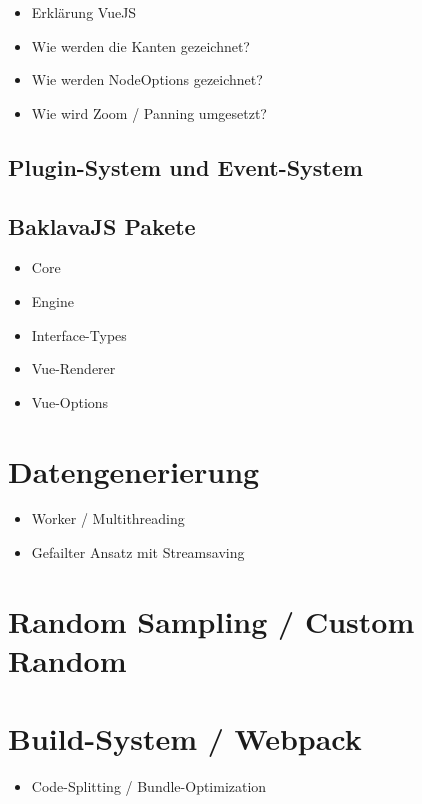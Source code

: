 \begin{itemize}
    \item Erklärung VueJS
    \item Wie werden die Kanten gezeichnet?
    \item Wie werden NodeOptions gezeichnet?
    \item Wie wird Zoom / Panning umgesetzt?
\end{itemize}

\subsection{Plugin-System und Event-System}

\subsection{BaklavaJS Pakete}
\begin{itemize}
    \item Core
    \item Engine
    \item Interface-Types
    \item Vue-Renderer
    \item Vue-Options
\end{itemize}

\section{Datengenerierung}

\begin{itemize}
    \item Worker / Multithreading
    \item Gefailter Ansatz mit Streamsaving
\end{itemize}

\section{Random Sampling / Custom Random}

\section{Build-System / Webpack}
\begin{itemize}
    \item Code-Splitting / Bundle-Optimization
\end{itemize}